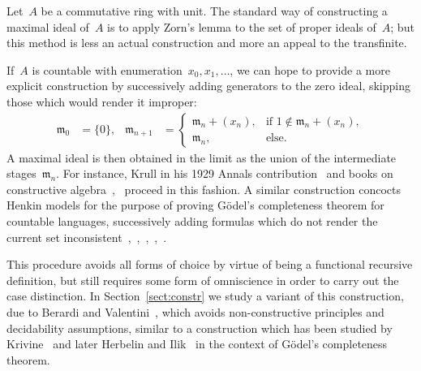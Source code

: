 \documentclass[com,11pt,crcready]{iosart2x}
\theoremstyle{definition}
\theoremstyle{plain}
\theoremstyle{remark}
\newcommand{\mmm}{\mathfrak{m}}
\renewcommand{\_}{\mathpunct{.}\,}
\begin{document}
\begin{frontmatter}
\begin{keyword}
\end{keyword}

\end{frontmatter}

\noindent
Let~$A$ be a commutative ring with unit. The standard way of constructing a
maximal ideal of~$A$ is to apply Zorn's lemma to the set of proper ideals
of~$A$; but this method is less an actual construction and more an appeal to
the transfinite.

If~$A$ is countable with enumeration~$x_0,x_1,\ldots$, we can hope to provide a
more explicit construction by successively adding generators to the zero ideal,
skipping those which would render it improper:
\begin{align*}
  \mmm_0 &= \{ 0 \}, &
  \mmm_{n+1} &= \begin{cases}
    \mmm_n + (x_n), & \text{if $1 \not\in \mmm_n + (x_n)$}, \\
    \mmm_n, & \text{else.}
  \end{cases}
\end{align*}
A maximal ideal is then obtained in the limit as the union of the intermediate
stages~$\mmm_n$. For instance, Krull in his 1929 Annals contribution~\cite[Hilfs\-satz]{krull:ohne} and books on constructive
algebra~\cite[Lemma~VI.3.2]{mines-richman-ruitenburg:constructive-algebra},~\cite[comment after Theorem~VII.5.2]{lombardi-quitte:constructive-algebra} proceed in this fashion.
A similar
construction concocts Henkin models for the purpose of proving
Gödel's completeness theorem for countable languages, successively adding
formulas which do not render the current set
inconsistent~\cite[Satz~I.56]{tarski:fundamental},~\cite[Lemma~1.5.7]{dalen:logic},~\cite[Lemma~III.5.4]{simpson:subsystems},~\cite[Lemma~2.1]{ishihara-khoussainov-nerode:decidable-kripke-models},~\cite[Section~A.4]{coquand-lombardi:hidden-krull}.

This procedure avoids all forms of choice by virtue of being a
functional recursive definition, but still requires some form of omniscience in
order to carry out the case distinction.
In Section~\ref{sect:constr} we study a variant of this construction, due to Berardi and
Valentini~\cite{berardi-valentini:krivine}, which
avoids non-constructive principles and decidability assumptions, similar to
a construction which has been studied by
Krivine~\cite[p.~410]{krivine:completeness} and later Herbelin and
Ilik~\cite[p.~11]{herbelin-ilik:henkin} in the
context of Gödel's completeness theorem.
\end{document}
